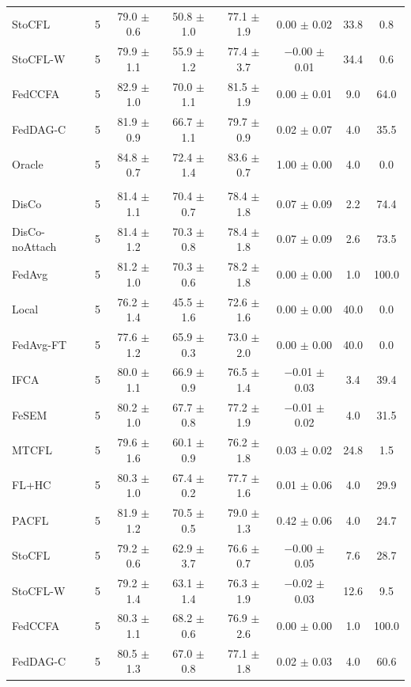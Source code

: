 {\begin{tabular}{l r c c c c c c}
StoCFL & 5 & 79.0 $\pm$ 0.6 & 50.8 $\pm$ 1.0 & 77.1 $\pm$ 1.9 & 0.00 $\pm$ 0.02 & 33.8 & 0.8 \\
StoCFL-W & 5 & 79.9 $\pm$ 1.1 & 55.9 $\pm$ 1.2 & 77.4 $\pm$ 3.7 & $-$0.00 $\pm$ 0.01 & 34.4 & 0.6 \\
FedCCFA & 5 & 82.9 $\pm$ 1.0 & 70.0 $\pm$ 1.1 & 81.5 $\pm$ 1.9 & 0.00 $\pm$ 0.01 & 9.0 & 64.0 \\
FedDAG-C & 5 & 81.9 $\pm$ 0.9 & 66.7 $\pm$ 1.1 & 79.7 $\pm$ 0.9 & 0.02 $\pm$ 0.07 & 4.0 & 35.5 \\
Oracle & 5 & 84.8 $\pm$ 0.7 & 72.4 $\pm$ 1.4 & 83.6 $\pm$ 0.7 & 1.00 $\pm$ 0.00 & 4.0 & 0.0 \\
\addlinespace
\multicolumn{8}{l}{\textit{CIFAR-10 (ResNet) rotation}} \\
DisCo & 5 & 81.4 $\pm$ 1.1 & 70.4 $\pm$ 0.7 & 78.4 $\pm$ 1.8 & 0.07 $\pm$ 0.09 & 2.2 & 74.4 \\
DisCo-noAttach & 5 & 81.4 $\pm$ 1.2 & 70.3 $\pm$ 0.8 & 78.4 $\pm$ 1.8 & 0.07 $\pm$ 0.09 & 2.6 & 73.5 \\
FedAvg & 5 & 81.2 $\pm$ 1.0 & 70.3 $\pm$ 0.6 & 78.2 $\pm$ 1.8 & 0.00 $\pm$ 0.00 & 1.0 & 100.0 \\
Local & 5 & 76.2 $\pm$ 1.4 & 45.5 $\pm$ 1.6 & 72.6 $\pm$ 1.6 & 0.00 $\pm$ 0.00 & 40.0 & 0.0 \\
FedAvg-FT & 5 & 77.6 $\pm$ 1.2 & 65.9 $\pm$ 0.3 & 73.0 $\pm$ 2.0 & 0.00 $\pm$ 0.00 & 40.0 & 0.0 \\
IFCA & 5 & 80.0 $\pm$ 1.1 & 66.9 $\pm$ 0.9 & 76.5 $\pm$ 1.4 & $-$0.01 $\pm$ 0.03 & 3.4 & 39.4 \\
FeSEM & 5 & 80.2 $\pm$ 1.0 & 67.7 $\pm$ 0.8 & 77.2 $\pm$ 1.9 & $-$0.01 $\pm$ 0.02 & 4.0 & 31.5 \\
MTCFL & 5 & 79.6 $\pm$ 1.6 & 60.1 $\pm$ 0.9 & 76.2 $\pm$ 1.8 & 0.03 $\pm$ 0.02 & 24.8 & 1.5 \\
FL+HC & 5 & 80.3 $\pm$ 1.0 & 67.4 $\pm$ 0.2 & 77.7 $\pm$ 1.6 & 0.01 $\pm$ 0.06 & 4.0 & 29.9 \\
PACFL & 5 & 81.9 $\pm$ 1.2 & 70.5 $\pm$ 0.5 & 79.0 $\pm$ 1.3 & 0.42 $\pm$ 0.06 & 4.0 & 24.7 \\
StoCFL & 5 & 79.2 $\pm$ 0.6 & 62.9 $\pm$ 3.7 & 76.6 $\pm$ 0.7 & $-$0.00 $\pm$ 0.05 & 7.6 & 28.7 \\
StoCFL-W & 5 & 79.2 $\pm$ 1.4 & 63.1 $\pm$ 1.4 & 76.3 $\pm$ 1.9 & $-$0.02 $\pm$ 0.03 & 12.6 & 9.5 \\
FedCCFA & 5 & 80.3 $\pm$ 1.1 & 68.2 $\pm$ 0.6 & 76.9 $\pm$ 2.6 & 0.00 $\pm$ 0.00 & 1.0 & 100.0 \\
FedDAG-C & 5 & 80.5 $\pm$ 1.3 & 67.0 $\pm$ 0.8 & 77.1 $\pm$ 1.8 & 0.02 $\pm$ 0.03 & 4.0 & 60.6 \\

\end{tabular}}
